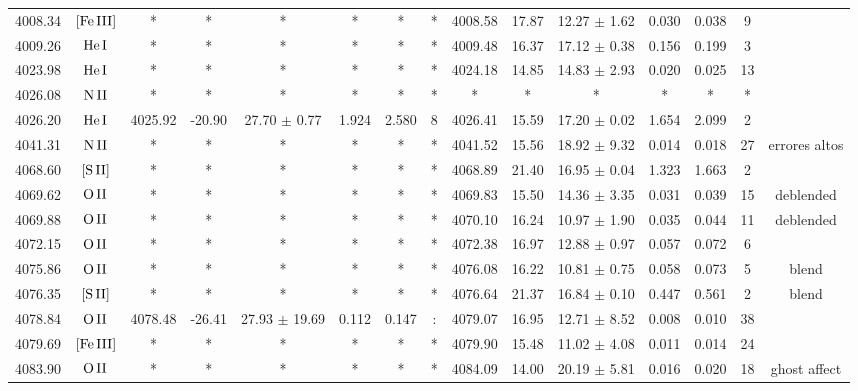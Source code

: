 \documentclass{article}
\begin{document}
\begin{table*}
\begin{adjustbox}{width=\textwidth}
\begin{tabular}{ccccccccccccccc}
4008.34 & $\mbox{[Fe}\thinspace \mbox{III]}$ & * & * & * & * & * & * & 4008.58 & 17.87 & 12.27 $\pm$ 1.62 & 0.030 & 0.038 & 9 &  \\
4009.26 & $\mbox{He}\thinspace \mbox{I}$ & * & * & * & * & * & * & 4009.48 & 16.37 & 17.12 $\pm$ 0.38 & 0.156 & 0.199 & 3 &  \\
4023.98 & $\mbox{He}\thinspace \mbox{I}$ & * & * & * & * & * & * & 4024.18 & 14.85 & 14.83 $\pm$ 2.93 & 0.020 & 0.025 & 13 &  \\
4026.08 & $\mbox{N}\thinspace \mbox{II}$ & * & * & * & * & * & * & * & * & * & * & * & * &  \\
4026.20 & $\mbox{He}\thinspace \mbox{I}$ & 4025.92 & -20.90 & 27.70 $\pm$ 0.77 & 1.924 & 2.580 & 8 & 4026.41 & 15.59 & 17.20 $\pm$ 0.02 & 1.654 & 2.099 & 2 &  \\
4041.31 & $\mbox{N}\thinspace \mbox{II}$ & * & * & * & * & * & * & 4041.52 & 15.56 & 18.92 $\pm$ 9.32 & 0.014 & 0.018 & 27 &  errores altos \\
4068.60 & $\mbox{[S}\thinspace \mbox{II]}$ & * & * & * & * & * & * & 4068.89 & 21.40 & 16.95 $\pm$ 0.04 & 1.323 & 1.663 & 2 &  \\
4069.62 & $\mbox{O}\thinspace \mbox{II}$ & * & * & * & * & * & * & 4069.83 & 15.50 & 14.36 $\pm$ 3.35 & 0.031 & 0.039 & 15 &  deblended \\
4069.88 & $\mbox{O}\thinspace \mbox{II}$ & * & * & * & * & * & * & 4070.10 & 16.24 & 10.97 $\pm$ 1.90 & 0.035 & 0.044 & 11 &  deblended \\
4072.15 & $\mbox{O}\thinspace \mbox{II}$ & * & * & * & * & * & * & 4072.38 & 16.97 & 12.88 $\pm$ 0.97 & 0.057 & 0.072 & 6 &  \\
4075.86 & $\mbox{O}\thinspace \mbox{II}$ & * & * & * & * & * & * & 4076.08 & 16.22 & 10.81 $\pm$ 0.75 & 0.058 & 0.073 & 5 &  blend \\
4076.35 & $\mbox{[S}\thinspace \mbox{II]}$ & * & * & * & * & * & * & 4076.64 & 21.37 & 16.84 $\pm$ 0.10 & 0.447 & 0.561 & 2 &  blend \\
4078.84 & $\mbox{O}\thinspace \mbox{II}$ & 4078.48 & -26.41 & 27.93 $\pm$ 19.69 & 0.112 & 0.147 & : & 4079.07 & 16.95 & 12.71 $\pm$ 8.52 & 0.008 & 0.010 & 38 &  \\
4079.69 & $\mbox{[Fe}\thinspace \mbox{III]}$ & * & * & * & * & * & * & 4079.90 & 15.48 & 11.02 $\pm$ 4.08 & 0.011 & 0.014 & 24 &  \\
4083.90 & $\mbox{O}\thinspace \mbox{II}$ & * & * & * & * & * & * & 4084.09 & 14.00 & 20.19 $\pm$ 5.81 & 0.016 & 0.020 & 18 &  ghost affect \\

\end{tabular}
\end{adjustbox}
\end{table*}
\end{document}
